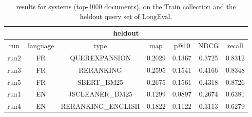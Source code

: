 \begin{table}[h!]
    \centering
    \begin{tabular}{ |c|c|c|c|c|c|c| }
        \hline
        \hline
        \multicolumn{7}{|c|}{heldout} \\ \hline
        run  & language & type & map & p@10 & NDCG & recall \\ \hline
        run2 &   FR   & QUEREXPANSION & 0.2029 & 0.1367 & 0.3725 & 0.8312 \\
        run3 &   FR   & RERANKING & 0.2595 & 0.1541 & 0.4166 & 0.8348 \\
        run5 &   FR   & SBERT\_BM25 & 0.2675 & 0.1561 & 0.4318 & 0.8726 \\
        \hline
        run1 &   EN   & JSCLEANER\_BM25 & 0.1299 & 0.0897 & 0.2674 & 0.6381 \\
        run4 &   EN   & RERANKING\_ENGLISH & 0.1822 & 0.1122 & 0.3113 & 0.6279 \\
        \hline
    \end{tabular}
    \caption{results for systems (top-1000 documents), on the Train collection and the heldout query set of LongEval.}
    \label{tab:results_submission_heldout}
\end{table}

